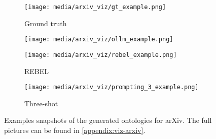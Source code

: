 \begin{figure}[t]
    \centering
    \begin{subfigure}[c]{0.48\textwidth}
        \centering
        \texttt{[image: media/arxiv\_viz/gt\_example.png]}
        \caption{Ground truth}
    \end{subfigure}%
    \hfill%
    \begin{subfigure}[c]{0.48\textwidth}
        \centering
        \texttt{[image: media/arxiv\_viz/ollm\_example.png]}
        \caption{\name}
        \label{fig:arxiv-examples:ollm}
    \end{subfigure}%
    \hfill%
    \begin{subfigure}[c]{0.48\textwidth}
        \centering
        \texttt{[image: media/arxiv\_viz/rebel\_example.png]}
        \caption{REBEL}
        \label{fig:arxiv-examples:rebel}
    \end{subfigure}%
    \hfill%
    \begin{subfigure}[c]{0.48\textwidth}
        \centering
        \texttt{[image: media/arxiv\_viz/prompting\_3\_example.png]}
        \caption{Three-shot}
        \label{fig:arxiv-examples:prompting}
    \end{subfigure}%
    \caption{Examples snapshots of the generated ontologies for arXiv. The full pictures can be found in \cref{appendix:viz-arxiv}.}
    \label{fig:arxiv-examples}
\end{figure}